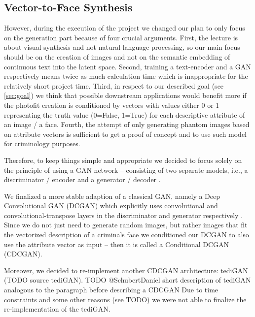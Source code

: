 \documentclass[12pt, a4paper]{article}
\begin{document}
\subsection{Vector-to-Face Synthesis}
\label{sec:vec-to-face}
However, during the execution of the project we changed our plan to only focus on the generation part because of four
crucial arguments. First, the lecture is about visual synthesis and not natural language processing, so our main focus
should be on the creation of images and not on the semantic embedding of continuous text into the latent space.
Second, training a text-encoder and a GAN respectively means twice as much calculation time which is inappropriate for
the relatively short project time. Third, in respect to our described goal (see \ref{sec:goal}) we think that possible
downstream applications would benefit more if the photofit creation is conditioned by vectors with values either 0 or 1
representing the truth value (0=False, 1=True) for each descriptive attribute of an image / a face. Fourth, the attempt
of only generating phantom images based on attribute vectors is sufficient to get a proof of concept and to use such 
model for criminology purposes.

Therefore, to keep things simple and appropriate we decided to focus solely on the principle of using a GAN network --
consisting of two separate models, i.e., a discriminator / encoder and a generator / decoder \cite{gan}.

We finalized a more stable adaption of a classical GAN, namely a Deep Convolutional GAN (DCGAN) which explicitly  uses
convolutional and convolutional-transpose layers in the discriminator and generator respectively \cite{dcgan}.
Since we do not just need to generate random images, but rather images that fit the vectorized description of
a criminals face we conditioned our DCGAN to also use the attribute vector as input -- then it is called a Conditional
DCGAN (CDCGAN).

Moreover, we decided to re-implement another CDCGAN architecture: tediGAN (TODO source tediGAN).
TODO @SchubertDaniel short description of tediGAN analogous to the paragraph before describing a CDCGAN
Due to time constraints and some other reasons (see TODO) we were not able to finalize the re-implementation of the
tediGAN.
\end{document}
